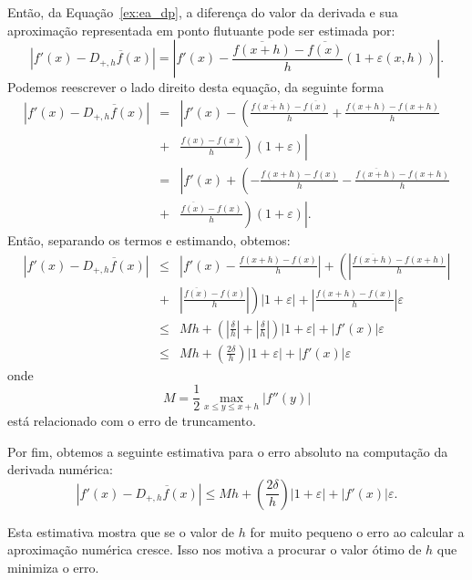 Então, da Equação~\eqref{ex:ea_dp}, a diferença do valor da derivada e sua aproximação representada em ponto flutuante pode ser estimada por:
\begin{equation}
\left|f'(x)-\overline{D_{+,h}f(x)}\right| = \left| f'(x)-\frac{\overline{f(x+h)}-\overline{f(x)}}{h}(1+\varepsilon(x,h)) \right|.
\end{equation}
Podemos reescrever o lado direito desta equação, da seguinte forma
\begin{eqnarray*}
  \left|f'(x)-\overline{D_{+,h}f(x)}\right| &=& \left| f'(x)-\left(\frac{\overline{f(x+h)}-\overline{f(x)}}{h}+\frac{f(x+h)-f(x+h)}{h}\right.\right. \\
&+& \left.\left.\frac{f(x)-f(x)}{h}\right)(1+\varepsilon) \right|\\
&=& \left| f'(x)+\left(-\frac{f(x+h)-f(x)}{h}-\frac{\overline{f(x+h)}-f(x+h)}{h}\right.\right.\\
&+& \left.\left. \frac{\overline{f(x)}-f(x)}{h}\right)(1+\varepsilon) \right|.
\end{eqnarray*}
Então, separando os termos e estimando, obtemos:
\begin{eqnarray*}
\left|f'(x)-\overline{D_{+,h}f(x)}\right| &\leq& \left|f'(x)-\frac{f(x+h)-f(x)}{h}\right| +\left(\left|\frac{\overline{f(x+h)}-f(x+h)}{h}\right|\right.\\
&+&\left.\left|\frac{\overline{f(x)}-f(x)}{h}\right| \right)|1+\varepsilon| + \left|\frac{f(x+h)-f(x)}{h}\right|\varepsilon\\
&\leq& Mh +\left(\left|\frac{\delta}{h}\right|+\left|\frac{\delta}{h}\right| \right)|1+\varepsilon| +|f'(x)|\varepsilon\\
&\leq& Mh +\left(\frac{2\delta}{h}\right)|1+\varepsilon| +|f'(x)|\varepsilon
\end{eqnarray*}
onde
$$
M=\frac{1}{2}\max_{x\leq y\leq x+h}|f''(y)|
$$
está relacionado com o erro de truncamento.

Por fim, obtemos a seguinte estimativa para o erro absoluto na computação da derivada numérica:
\begin{equation}\label{eq:est_erro_arredondamento}
  \left|f'(x)-\overline{D_{+,h}f(x)}\right| \leq Mh +\left(\frac{2\delta}{h}\right)|1+\varepsilon| +|f'(x)|\varepsilon.
\end{equation}

Esta estimativa mostra que se o valor de $h$ for muito pequeno o erro ao calcular a aproximação numérica cresce. Isso nos motiva a procurar o valor ótimo de $h$ que minimiza o erro.

